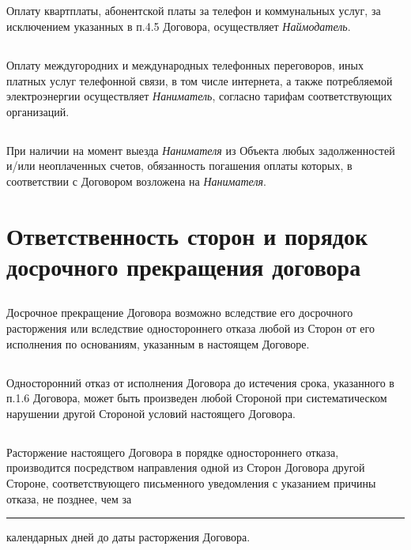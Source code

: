 \documentclass[a4paper, 11pt]{article}
\begin{document}
\subsection{} Оплату квартплаты, абонентской платы за телефон и коммунальных услуг, за
исключением указанных в п.4.5 Договора, осуществляет \textit{Наймодатель}.
\subsection{} Оплату междугородних и международных телефонных переговоров, иных платных
услуг телефонной связи, в том числе интернета, а также потребляемой
электроэнергии осуществляет \textit{Наниматель}, согласно тарифам соответствующих
организаций.
\subsection{} При наличии на момент выезда \textit{Нанимателя} из Объекта любых задолженностей
и/или неоплаченных счетов, обязанность погашения оплаты которых, в соответствии
с Договором возложена на \textit{Нанимателя}.

\section{Ответственность сторон и порядок досрочного прекращения договора}
\subsection{} Досрочное прекращение Договора возможно вследствие его досрочного
расторжения или вследствие одностороннего отказа любой из Сторон от его
исполнения по основаниям, указанным в настоящем Договоре.
\subsection{} Односторонний отказ от исполнения Договора до истечения срока, указанного в
п.1.6 Договора, может быть произведен любой Стороной при систематическом
нарушении другой Стороной условий настоящего Договора.
\subsection{} Расторжение настоящего Договора в порядке одностороннего отказа,
производится посредством направления одной из Сторон Договора другой Стороне,
соответствующего письменного уведомления с указанием причины отказа, не позднее,
чем за \rule{4cm}{0.5pt} календарных дней до даты расторжения Договора.
\end{document}
